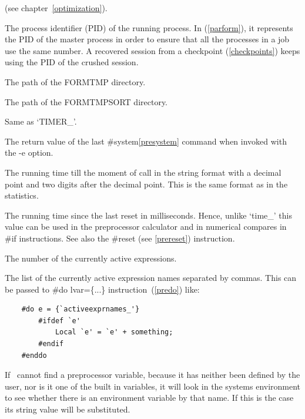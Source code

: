 \begin{description}
               (see chapter~\ref{optimization}).
\item[PID\_]         The process identifier (PID)   of
               the running process. In \ParFORM{} (\ref{parform}), it represents
               the PID of the master process in order to ensure that all the
               processes in a job use the same number. A recovered session from
               a checkpoint (\ref{checkpoints}) keeps using the PID of the
               crushed session.
\item[FORMTMP\_] The path of the FORMTMP directory.
\item[FORMTMPSORT\_] The path of the FORMTMPSORT directory.
\item[STOPWATCH\_] Same as `TIMER\_'.
\item[SYSTEMERROR\_] The return value of the last \#system\ref{presystem}
               command when invoked with the -e option.
\item[TIME\_]  The running time till the moment of call in the string format
               with a decimal point and two digits after the decimal point. 
               This is the same format as in the statistics.
\item[TIMER\_] The running time since the last reset in milliseconds. Hence, 
               unlike `time\_' this value can be used in the preprocessor 
               calculator and in numerical compares in \#if instructions.
               See also the \#reset (see \ref{prereset}) instruction.
\item[NUMACTIVEEXPRS\_]  The number of the currently active expressions.
\item[ACTIVEEXPRNAMES\_]  The list of the currently active expression names 
               separated by commas. This can be passed to \#do lvar=\{...\} 
               instruction~(\ref{predo}) like: 
\begin{verbatim}
    #do e = {`activeexprnames_'}
        #ifdef `e'
            Local `e' = `e' + something;
        #endif
    #enddo
\end{verbatim}
\end{description}

\noindent If \FORM\ cannot find a preprocessor variable, because it has 
neither been defined by the user, nor is it one of the built in variables, 
it will look in the systems environment to see whether 
there is an environment variable by that name. If this is the case its 
string value will be substituted.

